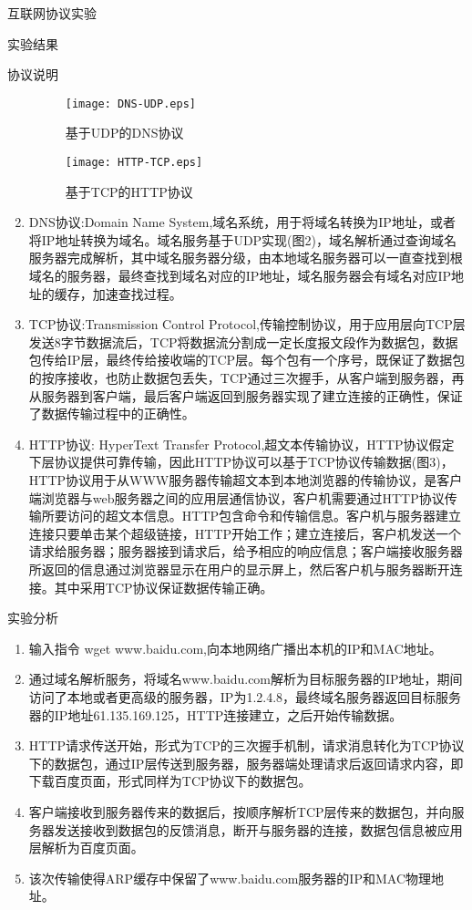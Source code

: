 \documentclass{article} %
\begin{document}
\begin{section}{互联网协议实验}
\begin{subsection}{实验结果}
\begin{subsubsection}{协议说明}
\begin{enumerate}[1)]
				\begin{figure}[htb]	
					\centering
					\texttt{[image: DNS-UDP.eps]}	
					\caption{基于UDP的DNS协议}
				\end{figure}
				\begin{figure}[htb]	
					\centering
					\texttt{[image: HTTP-TCP.eps]}	
					\caption{基于TCP的HTTP协议}
				\end{figure}
				\item DNS协议:Domain Name System,域名系统，用于将域名转换为IP地址，或者将IP地址转换为域名。域名服务基于UDP实现(图2)，域名解析通过查询域名服务器完成解析，其中域名服务器分级，由本地域名服务器可以一直查找到根域名的服务器，最终查找到域名对应的IP地址，域名服务器会有域名对应IP地址的缓存，加速查找过程。
				\item TCP协议:Transmission Control Protocol,传输控制协议，用于应用层向TCP层发送8字节数据流后，TCP将数据流分割成一定长度报文段作为数据包，数据包传给IP层，最终传给接收端的TCP层。每个包有一个序号，既保证了数据包的按序接收，也防止数据包丢失，TCP通过三次握手，从客户端到服务器，再从服务器到客户端，最后客户端返回到服务器实现了建立连接的正确性，保证了数据传输过程中的正确性。
				\item HTTP协议: HyperText Transfer Protocol,超文本传输协议，HTTP协议假定下层协议提供可靠传输，因此HTTP协议可以基于TCP协议传输数据(图3)，HTTP协议用于从WWW服务器传输超文本到本地浏览器的传输协议，是客户端浏览器与web服务器之间的应用层通信协议，客户机需要通过HTTP协议传输所要访问的超文本信息。HTTP包含命令和传输信息。客户机与服务器建立连接只要单击某个超级链接，HTTP开始工作；建立连接后，客户机发送一个请求给服务器；服务器接到请求后，给予相应的响应信息；客户端接收服务器所返回的信息通过浏览器显示在用户的显示屏上，然后客户机与服务器断开连接。其中采用TCP协议保证数据传输正确。
			\end{enumerate}
		\end{subsubsection}
	\end{subsection}
	\begin{subsection}{实验分析}
		\begin{enumerate}[1)]
			\item 输入指令 wget www.baidu.com,向本地网络广播出本机的IP和MAC地址。
			\item 通过域名解析服务，将域名www.baidu.com解析为目标服务器的IP地址，期间访问了本地或者更高级的服务器，IP为1.2.4.8，最终域名服务器返回目标服务器的IP地址61.135.169.125，HTTP连接建立，之后开始传输数据。
			\item HTTP请求传送开始，形式为TCP的三次握手机制，请求消息转化为TCP协议下的数据包，通过IP层传送到服务器，服务器端处理请求后返回请求内容，即下载百度页面，形式同样为TCP协议下的数据包。
			\item 客户端接收到服务器传来的数据后，按顺序解析TCP层传来的数据包，并向服务器发送接收到数据包的反馈消息，断开与服务器的连接，数据包信息被应用层解析为百度页面。
			\item 该次传输使得ARP缓存中保留了www.baidu.com服务器的IP和MAC物理地址。
		\end{enumerate}
	\end{subsection}
	
	\end{section}
\end{document}
